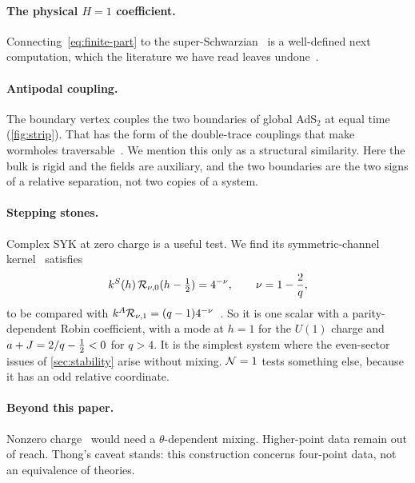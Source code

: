 \paragraph{The physical $H=1$ coefficient.} Connecting~\eqref{eq:finite-part} to the super-Schwarzian~\cite{Fu:2016vas,Forste:2017apw} is a well-defined next computation, which the literature we have read leaves undone~\cite{Peng:2017spg,Bulycheva:2018qcp}.

\paragraph{Antipodal coupling.} The boundary vertex couples the two boundaries of global AdS$_2$ at equal time (\cref{fig:strip}). That has the form of the double-trace couplings that make wormholes traversable~\cite{Gao:2016bin,Maldacena:2018lmt}. We mention this only as a structural similarity. Here the bulk is rigid and the fields are auxiliary, and the two boundaries are the two signs of a relative separation, not two copies of a system.

\paragraph{Stepping stones.} Complex SYK at zero charge is a useful test. We find its symmetric-channel kernel~\cite{Bulycheva:2017uqj,Gu:2019jub} satisfies
\begin{equation}
k^S(h)\,\mathcal{R}_{\nu,0}(h-\tfrac12)=4^{-\nu},\qquad\nu=1-\frac2q,
\end{equation}
to be compared with $k^A\mathcal{R}_{\nu,1}=(q-1)4^{-\nu}$~\cite{Thong:2026}. So it is one scalar with a parity-dependent Robin coefficient, with a mode at $h=1$ for the $U(1)$ charge and $a+J=2/q-\tfrac12<0$ for $q>4$. It is the simplest system where the even-sector issues of \cref{sec:stability} arise without mixing. $\mathcal{N}=1$ tests something else, because it has an odd relative coordinate.

\paragraph{Beyond this paper.} Nonzero charge~\cite{Gu:2019jub,Heydeman:2022lse} would need a $\theta$-dependent mixing. Higher-point data remain out of reach. Thong's caveat stands: this construction concerns four-point data, not an equivalence of theories.
